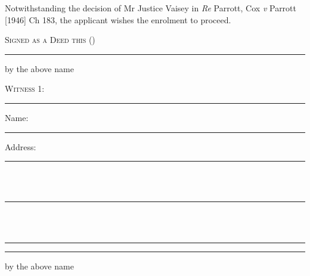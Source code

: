 \documentclass[10pt, twoside, a4paper]{article}
\begin{document}
\vspace{10pt}

\noindent Notwithstanding the decision of Mr Justice Vaisey in \textit{Re} Parrott, Cox
\textit{v} Parrott [1946] Ch 183, the applicant wishes the enrolment to proceed.

\vspace{24pt}

{
	\scshape
	\noindent Signed as a Deed this \worddate  \space (\numberdate)
}

\vspace{48pt}

\begin{multicols}{2}

	\par\noindent\hrule
	\vspace{14pt}

	{
		\centering
		\noindent
		by the above name \textbf{\scshape{\newname}}
		\par
	}

	\vspace{60pt}

	{\scshape \noindent Witness 1:}

	\vspace{48pt}
	\par\noindent\hrule
	\vspace{14pt}

	{
		\scshape

		\noindent Name: \\
		\noindent\hspace*{4em}\rule{0.35\textwidth}{0.5pt}

		\vspace{12pt}

		\noindent Address:

		\noindent\hspace*{4em}\rule{0.35\textwidth}{0.5pt} \\ \\
		\noindent\hspace*{4em}\rule{0.35\textwidth}{0.5pt} \\ \\
		\noindent\hspace*{4em}\rule{0.35\textwidth}{0.5pt}
	}

	\columnbreak

	\par\noindent\hrule
	\vspace{14pt}

	{
		\centering
		\noindent
		by the above name \textbf{\scshape{\oldname}}
		\par
	}


\end{multicols}
\end{document}
